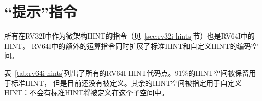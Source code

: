 \section{“提示”指令}
\label{sec:rv64i-hints}

所有在RV32I中作为微架构HINT的指令（见~\ref{sec:rv32i-hints}节）也是RV64I中的HINT。
RV64I中的额外的运算指令同时扩展了标准HINT和自定义HINT的编码空间。

表~\ref{tab:rv64i-hints}列出了所有的RV64I HINT代码点。91\%的HINT空间被保留用于标准HINT，
但是目前还没有被定义。其余的HINT空间被指定用于自定义HINT：不会有标准HINT将被定义在这个子空间中。

